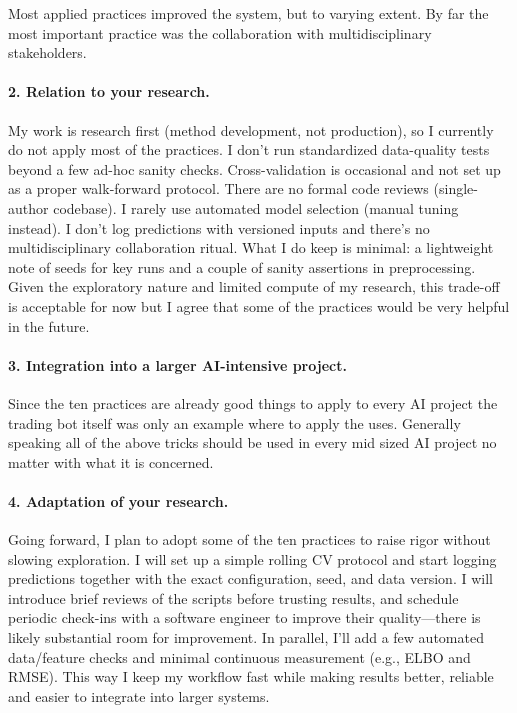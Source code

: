 \documentclass[11pt,a4paper]{article}
\begin{document}
Most applied practices improved the system, but to varying
extent. By far the most important practice was the collaboration with multidisciplinary stakeholders. 

\paragraph{2. Relation to your research.}
My work is research first (method development, not production), so I currently do not apply most of the practices. I don’t run standardized data-quality tests beyond a few ad-hoc sanity checks. Cross-validation is occasional and not set up as a proper walk-forward protocol. There are no formal code reviews (single-author codebase). I rarely use automated model selection (manual tuning instead). I don’t log predictions with versioned inputs and there’s no multidisciplinary collaboration ritual. What I do keep is minimal: a lightweight note of seeds for key runs and a couple of sanity assertions in preprocessing. Given the exploratory nature and limited compute of my research, this trade-off is acceptable for now but I agree that some of the practices would be very helpful in the future. 

\paragraph{3. Integration into a larger AI-intensive project.}
Since the ten practices are already good things to apply to every AI project the trading bot itself was only an example where to apply the uses. Generally speaking all of the above tricks should be used in every mid sized AI project no matter with what it is concerned.

\paragraph{4. Adaptation of your research.}
Going forward, I plan to adopt some of the ten practices to raise rigor without slowing exploration. I will set up a simple rolling CV protocol and start logging predictions together with the exact configuration, seed, and data version. I will introduce brief reviews of the scripts before trusting results, and schedule periodic check-ins with a software engineer to improve their quality—there is likely substantial room for improvement. In parallel, I’ll add a few automated data/feature checks and minimal continuous measurement (e.g., ELBO and RMSE). This way I keep my workflow fast while making results better, reliable and easier to integrate into larger systems.
\end{document}

